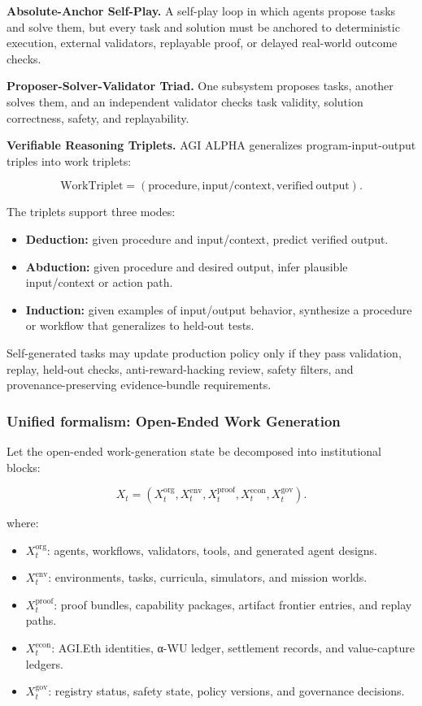 \textbf{Absolute-Anchor Self-Play.} A self-play loop in which agents
propose tasks and solve them, but every task and solution must be
anchored to deterministic execution, external validators, replayable
proof, or delayed real-world outcome checks.

\textbf{Proposer-Solver-Validator Triad.} One subsystem proposes tasks,
another solves them, and an independent validator checks task validity,
solution correctness, safety, and replayability.

\textbf{Verifiable Reasoning Triplets.} AGI ALPHA generalizes
program-input-output triples into work triplets:

\[
\mathrm{WorkTriplet}=(\mathrm{procedure},\mathrm{input/context},\mathrm{verified\ output}).
\]

The triplets support three modes:

\begin{itemize}
\tightlist
\item
  \textbf{Deduction:} given procedure and input/context, predict
  verified output.
\item
  \textbf{Abduction:} given procedure and desired output, infer
  plausible input/context or action path.
\item
  \textbf{Induction:} given examples of input/output behavior,
  synthesize a procedure or workflow that generalizes to held-out tests.
\end{itemize}

Self-generated tasks may update production policy only if they pass
validation, replay, held-out checks, anti-reward-hacking review, safety
filters, and provenance-preserving evidence-bundle requirements.

\subsubsection{Unified formalism: Open-Ended Work
Generation}\label{unified-formalism-open-ended-work-generation}

Let the open-ended work-generation state be decomposed into
institutional blocks:

\[
X_t=\left(X_t^{\mathrm{org}},X_t^{\mathrm{env}},X_t^{\mathrm{proof}},X_t^{\mathrm{econ}},X_t^{\mathrm{gov}}\right).
\]

where:

\begin{itemize}
\tightlist
\item
  \(X_t^{\mathrm{org}}\): agents, workflows, validators, tools, and
  generated agent designs.
\item
  \(X_t^{\mathrm{env}}\): environments, tasks, curricula, simulators,
  and mission worlds.
\item
  \(X_t^{\mathrm{proof}}\): proof bundles, capability packages, artifact
  frontier entries, and replay paths.
\item
  \(X_t^{\mathrm{econ}}\): AGI.Eth identities, α-WU ledger, settlement
  records, and value-capture ledgers.
\item
  \(X_t^{\mathrm{gov}}\): registry status, safety state, policy
  versions, and governance decisions.
\end{itemize}

